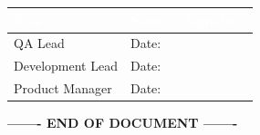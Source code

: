 \documentclass[12pt,a4paper]{article}
\begin{document}
\begin{table}[h]
\centering
\setlength{\extrarowheight}{15pt}
\begin{tabularx}{\textwidth}{|l|X|}
\hline
\rowcolor{headercolor}
\textcolor{white}{\textbf{Role}} & \textcolor{white}{\textbf{Name / Signature}} \\
\hline
QA Lead & \underline{\hspace{6cm}} Date: \underline{\hspace{2cm}} \\
\hline
Development Lead & \underline{\hspace{6cm}} Date: \underline{\hspace{2cm}} \\
\hline
Product Manager & \underline{\hspace{6cm}} Date: \underline{\hspace{2cm}} \\
\hline
\end{tabularx}
\end{table}

\vspace{2cm}

\begin{center}
    \textbf{------- END OF DOCUMENT -------}
\end{center}
\end{document}
